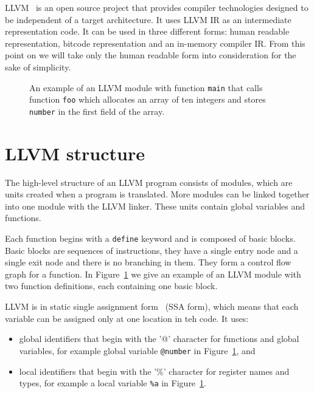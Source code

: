LLVM~\cite{llvm} is an open source project that provides compiler technologies
designed to be independent of a target architecture. It uses LLVM IR as an
intermediate representation code. It can be used in three different forms:
human readable representation, bitcode representation and an in-memory compiler
IR. From this point on we will take only the human readable form into
consideration for the sake of simplicity.

\begin{figure}[h]
 
 \caption{An example of an LLVM module with function \texttt{main} that calls
 function \texttt{foo} which allocates an array of ten integers and stores
 \texttt{number} in the first field of the array.}
 \label{fig:llvm_example}
\end{figure}

\section{LLVM structure} %

The high-level structure of an LLVM program consists of modules, which are
units created when a program is translated. More modules can be linked together
into one module with the LLVM linker. These units contain global variables and
functions.

Each function begins with a \texttt{define} keyword and is composed of basic
blocks. Basic blocks are sequences of instructions, they have a single entry node
and a single exit node and there is no branching in them. They form
a control flow graph for a function. In Figure~\ref{fig:llvm_example} we give
an example of an LLVM module with two function definitions, each containing one
basic block.

LLVM is in static single assignment form~\cite{ssa} (SSA form), which means that each
variable can be assigned only at one location in teh code. It uses:

\begin{itemize}
    \item global identifiers that begin with the '@' character for functions
    and global variables, for example global variable \texttt{@number} in
    Figure~\ref{fig:llvm_example}, and
    \item local identifiers that begin with the '\%' character for register
    names and types, for example a local variable \texttt{\%a} in
    Figure~\ref{fig:llvm_example}.
\end{itemize}

